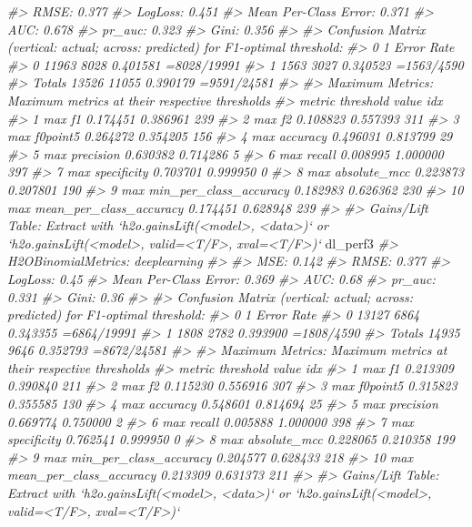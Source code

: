 \documentclass[]{book}
\newenvironment{Shaded}{\begin{snugshade}}{\end{snugshade}}
\newcommand{\CommentTok}[1]{\textcolor[rgb]{0.56,0.35,0.01}{\textit{#1}}}
\newcommand{\NormalTok}[1]{#1}
\begin{document}
\begin{Shaded}
\begin{Highlighting}[]
\CommentTok{#> RMSE:  0.377}
\CommentTok{#> LogLoss:  0.451}
\CommentTok{#> Mean Per-Class Error:  0.371}
\CommentTok{#> AUC:  0.678}
\CommentTok{#> pr_auc:  0.323}
\CommentTok{#> Gini:  0.356}
\CommentTok{#> }
\CommentTok{#> Confusion Matrix (vertical: actual; across: predicted) for F1-optimal threshold:}
\CommentTok{#>            0     1    Error         Rate}
\CommentTok{#> 0      11963  8028 0.401581  =8028/19991}
\CommentTok{#> 1       1563  3027 0.340523   =1563/4590}
\CommentTok{#> Totals 13526 11055 0.390179  =9591/24581}
\CommentTok{#> }
\CommentTok{#> Maximum Metrics: Maximum metrics at their respective thresholds}
\CommentTok{#>                         metric threshold    value idx}
\CommentTok{#> 1                       max f1  0.174451 0.386961 239}
\CommentTok{#> 2                       max f2  0.108823 0.557393 311}
\CommentTok{#> 3                 max f0point5  0.264272 0.354205 156}
\CommentTok{#> 4                 max accuracy  0.496031 0.813799  29}
\CommentTok{#> 5                max precision  0.630382 0.714286   5}
\CommentTok{#> 6                   max recall  0.008995 1.000000 397}
\CommentTok{#> 7              max specificity  0.703701 0.999950   0}
\CommentTok{#> 8             max absolute_mcc  0.223873 0.207801 190}
\CommentTok{#> 9   max min_per_class_accuracy  0.182983 0.626362 230}
\CommentTok{#> 10 max mean_per_class_accuracy  0.174451 0.628948 239}
\CommentTok{#> }
\CommentTok{#> Gains/Lift Table: Extract with `h2o.gainsLift(<model>, <data>)` or `h2o.gainsLift(<model>, valid=<T/F>, xval=<T/F>)`}
\NormalTok{dl_perf3}
\CommentTok{#> H2OBinomialMetrics: deeplearning}
\CommentTok{#> }
\CommentTok{#> MSE:  0.142}
\CommentTok{#> RMSE:  0.377}
\CommentTok{#> LogLoss:  0.45}
\CommentTok{#> Mean Per-Class Error:  0.369}
\CommentTok{#> AUC:  0.68}
\CommentTok{#> pr_auc:  0.331}
\CommentTok{#> Gini:  0.36}
\CommentTok{#> }
\CommentTok{#> Confusion Matrix (vertical: actual; across: predicted) for F1-optimal threshold:}
\CommentTok{#>            0    1    Error         Rate}
\CommentTok{#> 0      13127 6864 0.343355  =6864/19991}
\CommentTok{#> 1       1808 2782 0.393900   =1808/4590}
\CommentTok{#> Totals 14935 9646 0.352793  =8672/24581}
\CommentTok{#> }
\CommentTok{#> Maximum Metrics: Maximum metrics at their respective thresholds}
\CommentTok{#>                         metric threshold    value idx}
\CommentTok{#> 1                       max f1  0.213309 0.390840 211}
\CommentTok{#> 2                       max f2  0.115230 0.556916 307}
\CommentTok{#> 3                 max f0point5  0.315823 0.355585 130}
\CommentTok{#> 4                 max accuracy  0.548601 0.814694  25}
\CommentTok{#> 5                max precision  0.669774 0.750000   2}
\CommentTok{#> 6                   max recall  0.005888 1.000000 398}
\CommentTok{#> 7              max specificity  0.762541 0.999950   0}
\CommentTok{#> 8             max absolute_mcc  0.228065 0.210358 199}
\CommentTok{#> 9   max min_per_class_accuracy  0.204577 0.628433 218}
\CommentTok{#> 10 max mean_per_class_accuracy  0.213309 0.631373 211}
\CommentTok{#> }
\CommentTok{#> Gains/Lift Table: Extract with `h2o.gainsLift(<model>, <data>)` or `h2o.gainsLift(<model>, valid=<T/F>, xval=<T/F>)`}


\end{Highlighting}
\end{Shaded}
\end{document}
